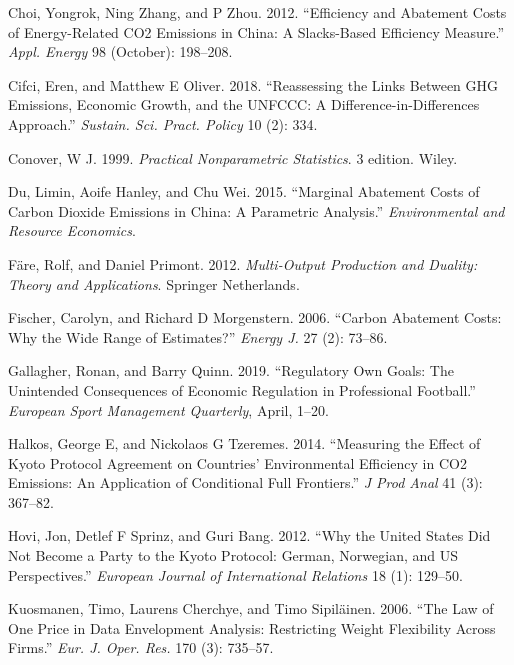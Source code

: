 \documentclass[
  10pt,
]{article}
\begin{document}
\leavevmode\hypertarget{ref-Choi2012}{}%
Choi, Yongrok, Ning Zhang, and P Zhou. 2012. ``Efficiency and Abatement
Costs of Energy-Related CO2 Emissions in China: A Slacks-Based
Efficiency Measure.'' \emph{Appl. Energy} 98 (October): 198--208.

\leavevmode\hypertarget{ref-Cifci2018}{}%
Cifci, Eren, and Matthew E Oliver. 2018. ``Reassessing the Links Between
GHG Emissions, Economic Growth, and the UNFCCC: A
Difference-in-Differences Approach.'' \emph{Sustain. Sci. Pract. Policy}
10 (2): 334.

\leavevmode\hypertarget{ref-Conover1999}{}%
Conover, W J. 1999. \emph{Practical Nonparametric Statistics}. 3
edition. Wiley.

\leavevmode\hypertarget{ref-Du2015}{}%
Du, Limin, Aoife Hanley, and Chu Wei. 2015. ``Marginal Abatement Costs
of Carbon Dioxide Emissions in China: A Parametric Analysis.''
\emph{Environmental and Resource Economics}.

\leavevmode\hypertarget{ref-Fare2012}{}%
Färe, Rolf, and Daniel Primont. 2012. \emph{Multi-Output Production and
Duality: Theory and Applications}. Springer Netherlands.

\leavevmode\hypertarget{ref-Fischer2006}{}%
Fischer, Carolyn, and Richard D Morgenstern. 2006. ``Carbon Abatement
Costs: Why the Wide Range of Estimates?'' \emph{Energy J.} 27 (2):
73--86.

\leavevmode\hypertarget{ref-Gallagher2019}{}%
Gallagher, Ronan, and Barry Quinn. 2019. ``Regulatory Own Goals: The
Unintended Consequences of Economic Regulation in Professional
Football.'' \emph{European Sport Management Quarterly}, April, 1--20.

\leavevmode\hypertarget{ref-Halkos2014}{}%
Halkos, George E, and Nickolaos G Tzeremes. 2014. ``Measuring the Effect
of Kyoto Protocol Agreement on Countries' Environmental Efficiency in
CO2 Emissions: An Application of Conditional Full Frontiers.'' \emph{J
Prod Anal} 41 (3): 367--82.

\leavevmode\hypertarget{ref-Hovi2012}{}%
Hovi, Jon, Detlef F Sprinz, and Guri Bang. 2012. ``Why the United States
Did Not Become a Party to the Kyoto Protocol: German, Norwegian, and US
Perspectives.'' \emph{European Journal of International Relations} 18
(1): 129--50.

\leavevmode\hypertarget{ref-Kuosmanen2006}{}%
Kuosmanen, Timo, Laurens Cherchye, and Timo Sipiläinen. 2006. ``The Law
of One Price in Data Envelopment Analysis: Restricting Weight
Flexibility Across Firms.'' \emph{Eur. J. Oper. Res.} 170 (3): 735--57.
\end{document}

